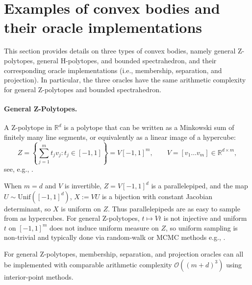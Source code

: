 \documentclass[11pt,letterpaper]{article}
\begin{document}
\section{Examples of convex bodies and their oracle implementations}
\label{appen_examplesconvexbodies}

This section provides details on three types of convex bodies, namely general Z-polytopes, general H-polytopes, and bounded spectrahedron, and their corresponding oracle implementations (i.e., membership, separation, and projection). In particular, the three oracles have the same arithmetic complexity for general Z-polytopes and bounded spectrahedron.

\paragraph*{General Z-Polytopes.}

A Z-polytope in $\mathbb{R}^d$ is a polytope that can be written as a Minkowski sum of finitely many line segments, or equivalently as a linear image of a hypercube:
\[
  Z   =  \left\{ \sum_{j=1}^m t_j v_j : t_j \in [-1,1]\right\}
   =  V[-1,1]^m,\qquad V = [v_1 \dots v_m]\in\mathbb{R}^{d\times m},
\]
see, e.g., \cite{Schneider2013}.

When $m=d$ and $V$ is invertible, $Z = V[-1,1]^d$ is a parallelepiped, and the map $U \sim \mathrm{Unif}([-1,1]^d)$, $X := VU$ is a bijection with constant Jacobian determinant, so $X$ is uniform on $Z$.
Thus parallelepipeds are as easy to sample from as hypercubes.
For general Z-polytopes, $t\mapsto Vt$ is not injective and uniform $t$ on $[-1,1]^m$ does not induce uniform measure on $Z$, so uniform sampling is non-trivial and typically done via random-walk or MCMC methods e.g., \cite{Chalkis2020}.

For general Z-polytopes, membership, separation, and projection oracles can all be implemented with comparable arithmetic complexity $\mathcal{O}((m+d)^3)$ using interior-point methods.
\end{document}
